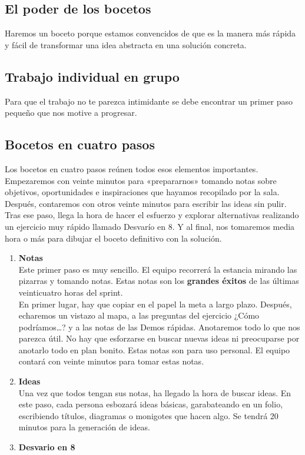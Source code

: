 \documentclass[10pt]{article}
\begin{document}
\begin{multicols}{2}
\subsection*{El poder de los bocetos}
Haremos un boceto porque estamos convencidos de que es la manera más rápida y fácil de transformar una idea abstracta en una solución concreta.
\subsection*{Trabajo individual en grupo}
Para que el trabajo no te parezca intimidante se debe encontrar un primer paso pequeño que nos motive a progresar.
\subsection*{Bocetos en cuatro pasos}
Los bocetos en cuatro pasos reúnen todos esos elementos importantes. Empezaremos con veinte minutos para «prepararnos» tomando notas sobre objetivos, oportunidades e inspiraciones que hayamos recopilado por la sala. Después, contaremos con otros veinte minutos para escribir las ideas sin pulir. Tras ese paso, llega la hora de hacer el esfuerzo y explorar alternativas realizando un ejercicio muy rápido llamado Desvarío en 8. Y al final, nos tomaremos media hora o más para dibujar el boceto definitivo con la solución.
\begin{enumerate}[\bfseries 1.]
\item \textbf{Notas}\\
Este primer paso es muy sencillo. El equipo recorrerá la estancia mirando las pizarras y tomando notas. Estas notas son los \textbf{grandes éxitos} de las últimas veinticuatro horas del sprint. \\
En primer lugar, hay que copiar en el papel la meta a largo plazo. Después, echaremos un vistazo al mapa, a las preguntas del ejercicio ¿Cómo podríamos…? y a las notas de las Demos rápidas. Anotaremos todo lo que nos parezca útil. No hay que esforzarse en buscar nuevas ideas ni preocuparse por anotarlo todo en plan bonito. Estas notas son para uso personal. El equipo contará con veinte minutos para tomar estas notas.
\item \textbf{Ideas}\\
Una vez que todos tengan sus notas, ha llegado la hora de buscar ideas. En este paso, cada persona esbozará ideas básicas, garabateando en un folio, escribiendo títulos, diagramas o monigotes que hacen algo. Se tendrá 20 minutos para la generación de ideas.
\item \textbf{Desvario en 8}\\

\end{enumerate}
\end{multicols}
\end{document}
